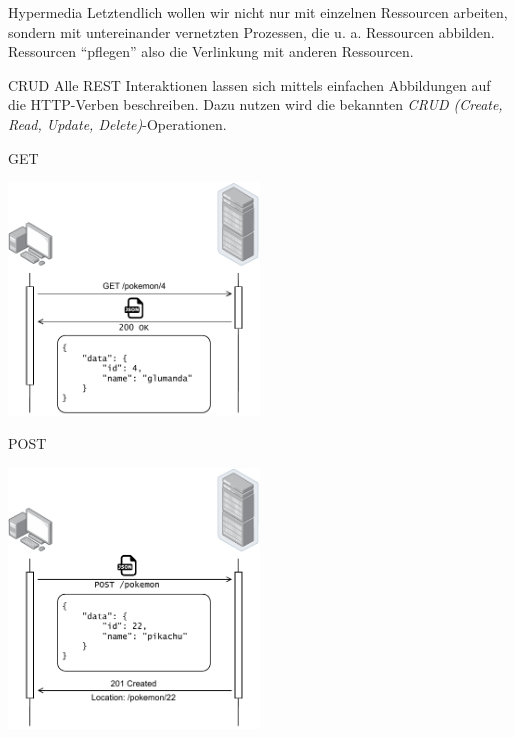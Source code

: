 \begin{defi}{Hypermedia}
    Letztendlich wollen wir nicht nur mit einzelnen Ressourcen arbeiten, sondern mit untereinander vernetzten Prozessen, die u. a. Ressourcen abbilden.
    Ressourcen \enquote{pflegen} also die Verlinkung mit anderen Ressourcen.
\end{defi}

\begin{defi}{CRUD}
    Alle REST Interaktionen lassen sich mittels einfachen Abbildungen auf die HTTP-Verben beschreiben.
    Dazu nutzen wird die bekannten \emph{CRUD (Create, Read, Update, Delete)}-Operationen.
\end{defi}

\begin{example}{GET}
    \begin{center}
        \includegraphics[width=0.5\textwidth]{includes/figures/example_rest_get.pdf}
    \end{center}
\end{example}

\begin{example}{POST}
    \begin{center}
        \includegraphics[width=0.5\textwidth]{includes/figures/example_rest_post.pdf}
    \end{center}
\end{example}

